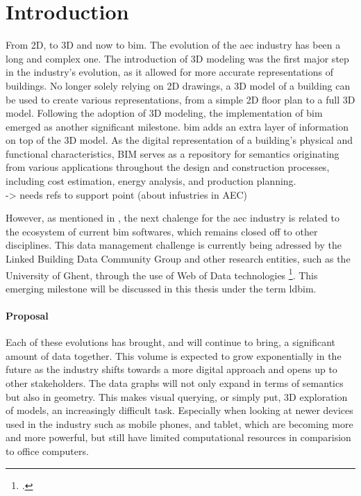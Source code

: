 \chapter{Introduction}
From 2D, to 3D and now to \acs{bim}. The evolution of the \ac{aec} industry has been a long and complex one. The introduction of 3D modeling was the first major step in the industry's evolution, as it allowed for more accurate representations of buildings. No longer solely relying on 2D drawings, a 3D model of a building can be used to create various representations, from a simple 2D floor plan to a full 3D model. Following the adoption of 3D modeling, the implementation of \ac{bim} emerged as another significant milestone. \ac{bim} adds an extra layer of information on top of the 3D model. As the digital representation of a building's physical and functional characteristics, BIM serves as a repository for semantics originating from various applications throughout the design and construction processes, including cost estimation, energy analysis, and production planning.\\
-> needs refs to support point (about infustries in AEC)

\label{sec:intro}
However, as mentioned in \cite{Werbrouck2018}, the next chalenge for the \ac{aec} industry is related to the ecosystem of current \ac{bim} softwares, which remains closed off to other disciplines. This data management challenge is currently being adressed by the Linked Building Data Community Group and other research entities, such as the University of Ghent, through the use of Web of Data technologies \footcite{ldbimGroup}. This emerging milestone will be discussed in this thesis under the term \ac{ldbim}.

\subsubsection*{Proposal}
Each of these evolutions has brought, and will continue to bring, a significant amount of data together. This volume is expected to grow exponentially in the future as the industry shifts towards a more digital approach and opens up to other stakeholders. The data graphs will not only expand in terms of semantics but also in geometry. This makes visual querying, or simply put, 3D exploration of models, an increasingly difficult task. Especially when looking at newer devices used in the industry such as mobile phones, and tablet, which are becoming more and more powerful, but still have limited computational resources in comparision to office computers.

